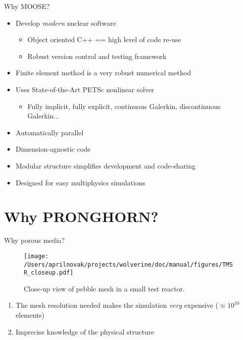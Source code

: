 \documentclass{beamer}
\begin{document}
\begin{frame}{Why MOOSE?}

\begin{itemize}
  \item Develop \textit{modern} nuclear software
  \begin{itemize}
  	\item Object oriented C++ == high level of code re-use
	\item Robust version control and testing framework
  \end{itemize}
  \item Finite element method is a very robust numerical method
  \item Uses State-of-the-Art PETSc nonlinear solver
  \begin{itemize}
  	\item Fully implicit, fully explicit, continuous Galerkin, discontinuous Galerkin...
  \end{itemize}
  \item Automatically parallel
  \item Dimension-agnostic code
  \item Modular structure simplifies development and code-sharing
  \item Designed for easy multiphysics simulations
\end{itemize}

\end{frame}


\section{Why PRONGHORN?}

\begin{frame}{Why porous media?}

\begin{figure}[H]
\centering
\texttt{[image: /Users/aprilnovak/projects/wolverine/doc/manual/figures/TMSR\_closeup.pdf]}
\caption{Close-up view of pebble mesh in a small test reactor.}
\label{fig:TMSRmesh}
\end{figure}

\begin{enumerate}
\item The mesh resolution needed makes the simulation \textit{very} expensive (\(\approx10^10\) elements)
\item Imprecise knowledge of the physical structure
\end{enumerate}

\end{frame}
\end{document}
